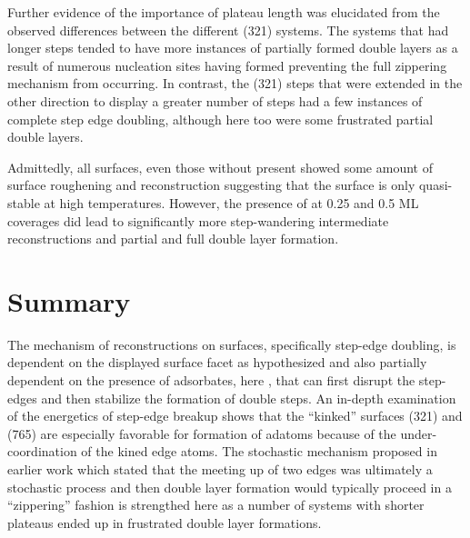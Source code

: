 Further evidence of the importance of plateau length was elucidated from the
observed differences between the different (321) systems. The systems that had
longer steps tended to have more instances of partially formed double layers as
a result of numerous nucleation sites having formed preventing the full
zippering mechanism from occurring. In contrast, the (321) steps that were
extended in the other direction to display a greater number of steps had a few
instances of complete step edge doubling, although here too were some
frustrated partial double layers.

Admittedly, all surfaces, even those without  present showed some amount
of surface roughening and reconstruction suggesting that the surface is only
quasi-stable at high temperatures. However, the presence of  at 0.25 and
0.5 ML coverages did lead to significantly more step-wandering intermediate
reconstructions and partial and full double layer formation.


\section{Summary}
The mechanism of reconstructions on  surfaces, specifically step-edge
doubling, is dependent on the displayed surface facet as hypothesized and also
partially dependent on the presence of adsorbates, here , that can first
disrupt the step-edges and then stabilize the formation of double steps. An in-depth
examination of the energetics of step-edge breakup shows that the ``kinked''
surfaces (321) and (765) are especially favorable for formation of adatoms
because of the under-coordination of the kined edge atoms. The stochastic
mechanism proposed in earlier work which stated that the meeting up of two
edges was ultimately a stochastic process and then double layer formation would
typically proceed in a ``zippering'' fashion is strengthed here as a number of
systems with shorter plateaus ended up in frustrated double layer formations.

